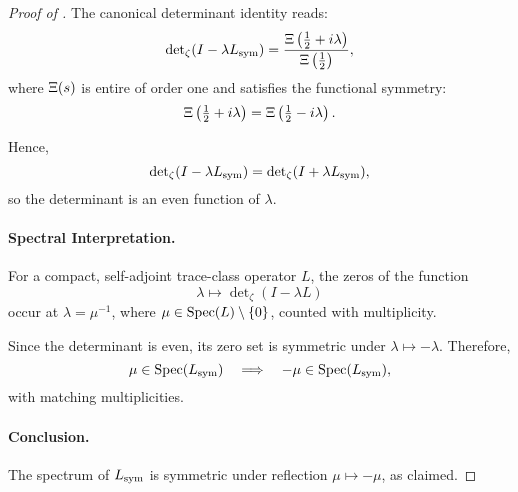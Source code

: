 \begin{proof}[Proof of ]
The canonical determinant identity reads:
\[
\det\nolimits_\zeta(I - \lambda L_{\mathrm{sym}}) = \frac{\Xi\left(\tfrac{1}{2} + i\lambda\right)}{\Xi\left(\tfrac{1}{2}\right)},
\]
where \( \Xi(s) \) is entire of order one and satisfies the functional symmetry:
\[
\Xi\left(\tfrac{1}{2} + i\lambda\right) = \Xi\left(\tfrac{1}{2} - i\lambda\right).
\]

Hence,
\[
\det\nolimits_\zeta(I - \lambda L_{\mathrm{sym}}) = \det\nolimits_\zeta(I + \lambda L_{\mathrm{sym}}),
\]
so the determinant is an even function of \( \lambda \).

\paragraph{Spectral Interpretation.}
For a compact, self-adjoint trace-class operator \( L \), the zeros of the function
\[
\lambda \mapsto \det\nolimits_\zeta(I - \lambda L)
\]
occur at \( \lambda = \mu^{-1} \), where \( \mu \in \operatorname{Spec}(L) \setminus \{0\} \), counted with multiplicity.

Since the determinant is even, its zero set is symmetric under \( \lambda \mapsto -\lambda \). Therefore,
\[
\mu \in \operatorname{Spec}(L_{\mathrm{sym}}) \quad \Longrightarrow \quad -\mu \in \operatorname{Spec}(L_{\mathrm{sym}}),
\]
with matching multiplicities.

\paragraph{Conclusion.}
The spectrum of \( L_{\mathrm{sym}} \) is symmetric under reflection \( \mu \mapsto -\mu \), as claimed.
\end{proof}
